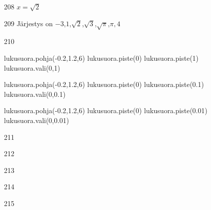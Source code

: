 \begin{Vastaus}{208}
	$x = \sqrt{2}$
\end{Vastaus}
\begin{Vastaus}{209}
Järjestys on \mbox{$-3$,$1$,$\sqrt{2}$,$\sqrt{3}$,$\sqrt{\pi}$,$\pi,4$}
	
\end{Vastaus}
\begin{Vastaus}{210}
\begin{kuva}
	lukusuora.pohja(-0.2,1.2,6)
	lukusuora.piste(0)
	lukusuora.piste(1)
	lukusuora.vali(0,1)
\end{kuva}
\begin{kuva}
	lukusuora.pohja(-0.2,1.2,6)
	lukusuora.piste(0)
	lukusuora.piste(0.1)
	lukusuora.vali(0,0.1)
\end{kuva}
\begin{kuva}
	lukusuora.pohja(-0.2,1.2,6)
	lukusuora.piste(0)
	lukusuora.piste(0.01)
	lukusuora.vali(0,0.01)
\end{kuva}
	
\end{Vastaus}
\begin{Vastaus}{211}
	
\end{Vastaus}
\begin{Vastaus}{212}
\end{Vastaus}
\begin{Vastaus}{213}
	
\end{Vastaus}
\begin{Vastaus}{214}
	
\end{Vastaus}
\begin{Vastaus}{215}
	
\end{Vastaus}
